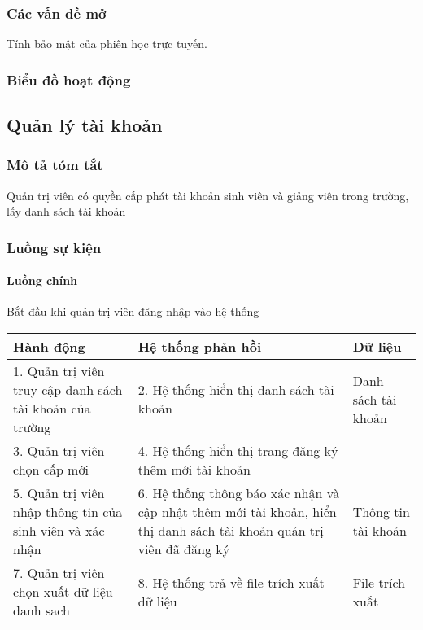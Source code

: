 \documentclass[./../main_file.tex]{subfiles}
\begin{document}
\subsubsection{Các vấn đề mở}
Tính bảo mật của phiên học trực tuyến.

\subsubsection{Biểu đồ hoạt động}

\subsection{Quản lý tài khoản}
\subsubsection{Mô tả tóm tắt}
Quản trị viên có quyền cấp phát tài khoản sinh viên và giảng viên trong trường, lấy danh sách tài khoản

\subsubsection{Luồng sự kiện}
\paragraph{Luồng chính}
 Bắt đầu khi quản trị viên đăng nhập vào hệ thống
 \begin{table}[H]
 				\begin{tabular}{|p{.33\textwidth}|p{}|p{}|}
 		\hline
 		\textbf{Hành động}                                       & \textbf{Hệ thống phản hồi}                            & \textbf{Dữ liệu}    \\ \hline
 		1. Quản trị viên truy cập danh sách tài khoản của trường & 2. Hệ thống hiển thị danh sách tài khoản              & Danh sách tài khoản \\ \hline
 		3. Quản trị viên chọn cấp mới                            & 4. Hệ thống hiển thị trang đăng ký thêm mới tài khoản &                     \\ \hline
 		5. Quản trị viên nhập thông tin của sinh viên và  xác nhận &
 		6. Hệ thống thông báo xác nhận và cập nhật thêm mới tài khoản, hiển thị danh sách tài khoản quản trị viên đã đăng ký &
 		Thông tin tài khoản \\ \hline
 		7. Quản trị viên chọn xuất dữ liệu danh sach             & 8. Hệ thống trả về file trích xuất dữ liệu            & File trích xuất     \\ \hline
 	\end{tabular}
 \end{table}
\end{document}
